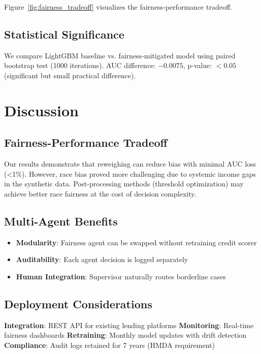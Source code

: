 \documentclass[11pt]{article}
\begin{document}
Figure~\ref{fig:fairness_tradeoff} visualizes the fairness-performance tradeoff.

\subsection{Statistical Significance}

We compare LightGBM baseline vs. fairness-mitigated model using paired bootstrap test (1000 iterations). AUC difference: $-0.0075$, p-value: $<0.05$ (significant but small practical difference).

\section{Discussion}

\subsection{Fairness-Performance Tradeoff}

Our results demonstrate that reweighing can reduce bias with minimal AUC loss (<1\%). However, race bias proved more challenging due to systemic income gaps in the synthetic data. Post-processing methods (threshold optimization) may achieve better race fairness at the cost of decision complexity.

\subsection{Multi-Agent Benefits}

\begin{itemize}
    \item \textbf{Modularity}: Fairness agent can be swapped without retraining credit scorer
    \item \textbf{Auditability}: Each agent decision is logged separately
    \item \textbf{Human Integration}: Supervisor naturally routes borderline cases
\end{itemize}

\subsection{Deployment Considerations}

\textbf{Integration}: REST API for existing lending platforms  
\textbf{Monitoring}: Real-time fairness dashboards  
\textbf{Retraining}: Monthly model updates with drift detection  
\textbf{Compliance}: Audit logs retained for 7 years (HMDA requirement)
\end{document}
